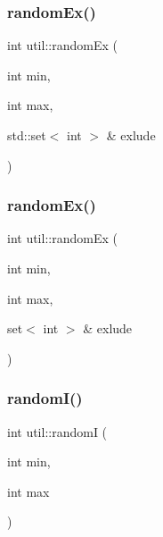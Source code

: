 \mbox{\label{namespaceutil_ae080f004741b0ea81032b3ec0c723f4c}} 
\subsubsection{\texorpdfstring{random\+Ex()}{randomEx()}\hspace{0.1cm}{\footnotesize\ttfamily [1/2]}}
{\footnotesize\ttfamily int util\+::random\+Ex (\begin{DoxyParamCaption}\item[{int}]{min,  }\item[{int}]{max,  }\item[{std\+::set$<$ int $>$ \&}]{exlude }\end{DoxyParamCaption})}

\mbox{\label{namespaceutil_a8751577b60f8e83b41c3cca32d65b677}} 
\subsubsection{\texorpdfstring{random\+Ex()}{randomEx()}\hspace{0.1cm}{\footnotesize\ttfamily [2/2]}}
{\footnotesize\ttfamily int util\+::random\+Ex (\begin{DoxyParamCaption}\item[{int}]{min,  }\item[{int}]{max,  }\item[{set$<$ int $>$ \&}]{exlude }\end{DoxyParamCaption})}

\mbox{\label{namespaceutil_ab473893d6b386b2da951b72b4d40c085}} 
\subsubsection{\texorpdfstring{random\+I()}{randomI()}}
{\footnotesize\ttfamily int util\+::randomI (\begin{DoxyParamCaption}\item[{int}]{min,  }\item[{int}]{max }\end{DoxyParamCaption})}

